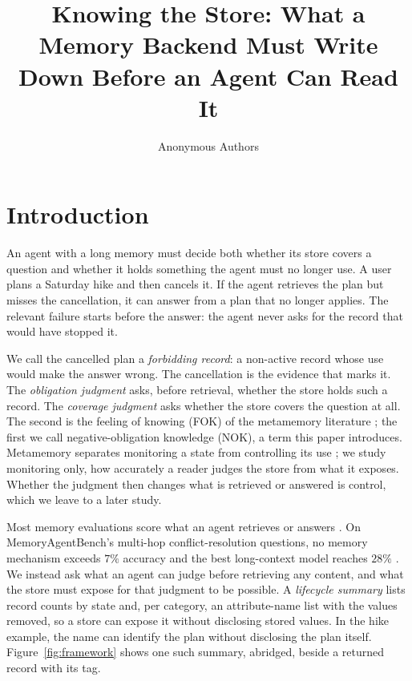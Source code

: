 \documentclass{article}
\title{Knowing the Store: What a Memory Backend Must Write Down Before an Agent Can Read It}
\author{Anonymous Authors}
\begin{document}
\maketitle

\section{Introduction}\label{sec:intro}

An agent with a long memory must decide both whether its store covers a question and whether it holds something the agent must no longer use. A user plans a Saturday hike and then cancels it. If the agent retrieves the plan but misses the cancellation, it can answer from a plan that no longer applies. The relevant failure starts before the answer: the agent never asks for the record that would have stopped it.

We call the cancelled plan a \emph{forbidding record}: a non-active record whose use would make the answer wrong. The cancellation is the evidence that marks it. The \emph{obligation judgment} asks, before retrieval, whether the store holds such a record. The \emph{coverage judgment} asks whether the store covers the question at all. The second is the feeling of knowing (FOK) of the metamemory literature \citep{hart1965,nelson1990,koriat1993}; the first we call negative-obligation knowledge (NOK), a term this paper introduces. Metamemory separates monitoring a state from controlling its use \citep{nelson1990}; we study monitoring only, how accurately a reader judges the store from what it exposes. Whether the judgment then changes what is retrieved or answered is control, which we leave to a later study.

Most memory evaluations score what an agent retrieves or answers \citep{longmemeval,locomo,memoryagentbench,stale}. On MemoryAgentBench's multi-hop conflict-resolution questions, no memory mechanism exceeds $7\%$ accuracy and the best long-context model reaches $28\%$ \citep{memoryagentbench}. We instead ask what an agent can judge before retrieving any content, and what the store must expose for that judgment to be possible. A \emph{lifecycle summary} lists record counts by state and, per category, an attribute-name list with the values removed, so a store can expose it without disclosing stored values. In the hike example, the name can identify the plan without disclosing the plan itself. Figure~\ref{fig:framework} shows one such summary, abridged, beside a returned record with its tag.
\end{document}
